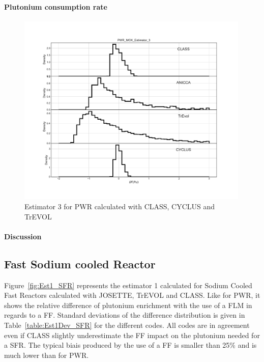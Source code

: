 \paragraph{Plutonium consumption rate}
\begin{figure}[h]
	\begin{center}
		\includegraphics[width = 0.99\textwidth]{../../Feature_1/RAW_DATA/FIG/PWR_MOX_Estimator_3.pdf}
		\caption{Estimator 3 for PWR calculated with CLASS, CYCLUS and TrEVOL}
		\label{fig:Est3_PWR}
	\end{center}
\end{figure}


\paragraph{Discussion}

\subsection{Fast Sodium cooled Reactor}


Figure~\ref{fig:Est1_SFR} represents the estimator 1 calculated for Sodium Cooled Fast Reactors calculated with JOSETTE, TrEVOL and CLASS. Like for PWR, it shows the relative difference of plutonium enrichment with the use of a FLM in regards to a FF. Standard deviations of the difference distribution is given in Table~\ref{table:Est1Dev_SFR} for the different codes. 
All codes are in agreement even if CLASS slightly underestimate the FF impact on the plutonium needed for a SFR. The typical biais produced by the use of a FF is smaller than 25\% and is much lower than for PWR.  

